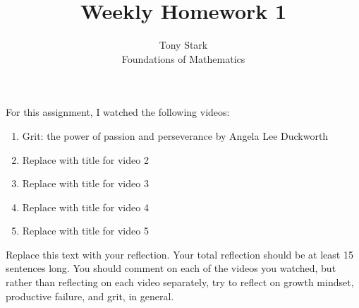 \documentclass[12pt]{article}
\begin{document}
 
 
\title{Weekly Homework 1}
\author{Tony Stark\\ %
Foundations of Mathematics}

\maketitle

\noindent For this assignment, I watched the following videos:

\begin{enumerate} %
\item Grit: the power of passion and perseverance by Angela Lee Duckworth  
\item Replace with title for video 2
\item Replace with title for video 3
\item Replace with title for video 4
\item Replace with title for video 5
\end{enumerate}

Replace this text with your reflection.  Your total reflection should be at least 15 sentences long. You should comment on each of the videos you watched, but rather than reflecting on each video separately, try to reflect on growth mindset, productive failure, and grit, in general.
 
 
\end{document}
